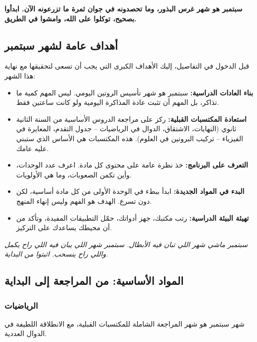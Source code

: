 \documentclass[12pt,a4paper]{book}
\newcommand{\quoteAr}[1]{%
	\begin{myquote}
		\itshape #1
	\end{myquote}
}
\newcommand{\importantAr}[1]{%
	\begin{important}
		\bfseries #1
	\end{important}
}
\begin{document}
	\importantAr{سبتمبر هو شهر غرس البذور، وما تحصدونه في جوان ثمرة ما تزرعونه الآن. ابدأوا بصحيح، توكلوا على الله، وامشوا في الطريق.}
	
	\subsection{أهداف عامة لشهر سبتمبر}
	
	قبل الدخول في التفاصيل، إليك الأهداف الكبرى التي يجب أن تسعى لتحقيقها مع نهاية هذا الشهر:
	
	\begin{itemize}
		\item \textbf{بناء العادات الدراسية:} سبتمبر هو شهر تأسيس الروتين اليومي. ليس المهم كمية ما تذاكر، بل المهم أن تثبت عادة المذاكرة اليومية ولو كانت ساعتين فقط.
		\item \textbf{استعادة المكتسبات القبلية:} ركز على مراجعة الدروس الأساسية من السنة الثانية ثانوي (النهايات، الاشتقاق، الدوال في الرياضيات – جدول التقدم، المعايرة في الفيزياء – تركيب البروتين في العلوم). هذه المكتسبات هي الأساس الذي ستبني عليه عامك.
		\item \textbf{التعرف على البرنامج:} خذ نظرة عامة على محتوى كل مادة. اعرف عدد الوحدات، وأين تكمن الصعوبات، وما هي الأولويات.
		\item \textbf{البدء في المواد الجديدة:} ابدأ ببطء في الوحدة الأولى من كل مادة أساسية، لكن دون تسرع. الهدف هو الفهم وليس إنهاء المنهج.
		\item \textbf{تهيئة البيئة الدراسية:} رتب مكتبك، جهز أدواتك، حمّل التطبيقات المفيدة، وتأكد من أن محيطك يساعدك على التركيز.
	\end{itemize}
	
	\quoteAr{سبتمبر ماشي شهر اللي تبان فيه الأبطال. سبتمبر شهر اللي يبان فيه اللي راح يكمل واللي راح ينسحب. اثبتوا من البداية.}
	
	\subsection{المواد الأساسية: من المراجعة إلى البداية}
	
	\subsubsection{الرياضيات}
	
	شهر سبتمبر هو شهر المراجعة الشاملة للمكتسبات القبلية، مع الانطلاقة اللطيفة في الدوال العددية.
	
\end{document}
